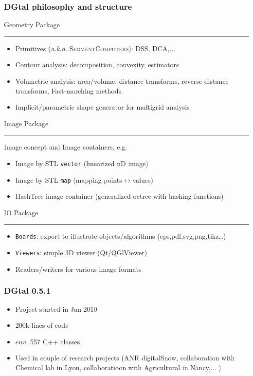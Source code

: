 \documentclass[8pt]{beamer}
\newcommand{\HH}{ \vspace{0.5pt}\hrule}
\begin{document}
\begin{frame}
  \frametitle{DGtal philosophy and structure}
    \begin{alertblock}{\centering Geometry Package\HH}
    \small
    \begin{itemize}
    \item Primitives (\emph{a.k.a.} \textsc{SegmentComputers}): DSS, DCA,...
    \item Contour analysis: decomposition, convexity, estimators
    \item Volumetric analysis: area/volume, distance transforms,
      reverse distance transforms, Fast-marching methods.
    \item Implicit/parametric shape generator for multigrid analysis
    \end{itemize}
  \end{alertblock}
  
  \begin{alertblock}{\centering Image Package\HH}
    Image concept and Image containers, e.g.
    \begin{itemize}
    \item Image by STL \texttt{vector} (linearized nD image)
    \item Image by STL \texttt{map} (mapping points$\leftrightarrow$values)
    \item HashTree image container (generalized octree with hashing functions)
    \end{itemize}
  \end{alertblock}
  

  \begin{alertblock}{\centering IO Package\HH}
    \small
    \begin{itemize}
    \item \texttt{Boards}: export to illustrate objects/algorithms (eps,pdf,svg,png,tikz\ldots)  
    \item \texttt{Viewers}:  simple 3D viewer (Qt/QGlViewer)
    \item Readers/writers for various image formats
    \end{itemize}
  \end{alertblock}
\end{frame}
\begin{frame}%
  \frametitle{DGtal 0.5.1}

\begin{itemize}
\item Project started in Jan 2010
\item 200k lines of code
\item $env.$ 557 C++ classes 
\item Used in couple of research projects (ANR digitalSnow,
  collaboration with Chemical lab in Lyon, collaboratioon with
  Agricultural in Nancy,... )
\end{itemize}
  
\end{frame}
\end{document}
